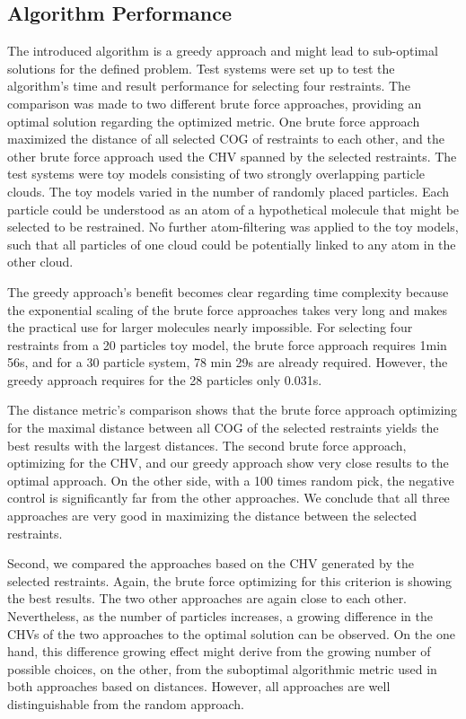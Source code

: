 
\subsection{Algorithm Performance}
The introduced algorithm is a greedy approach and might lead to sub-optimal solutions for the defined problem. Test systems were set up to test the algorithm's time and result performance for selecting four restraints. The comparison was made to two different brute force approaches, providing an optimal solution regarding the optimized metric. One brute force approach maximized the distance of all selected COG of restraints to each other, and the other brute force approach used the CHV spanned by the selected restraints. The test systems were toy models consisting of two strongly overlapping particle clouds. The toy models varied in the number of randomly placed particles.  Each particle could be understood as an atom of a hypothetical molecule that might be selected to be restrained. No further atom-filtering was applied to the toy models, such that all particles of one cloud could be potentially linked to any atom in the other cloud.

The greedy approach's benefit becomes clear regarding time complexity because the exponential scaling of the brute force approaches takes very long and makes the practical use for larger molecules nearly impossible. For selecting four restraints from a 20 particles toy model, the brute force approach requires 1min 56s, and for a 30 particle system, 78 min 29s are already required. However, the greedy approach requires for the 28 particles only 0.031s.

The distance metric's comparison shows that the brute force approach optimizing for the maximal distance between all COG of the selected restraints yields the best results with the largest distances. The second brute force approach, optimizing for the CHV, and our greedy approach show very close results to the optimal approach. On the other side, with a 100 times random pick, the negative control is significantly far from the other approaches. We conclude that all three approaches are very good in maximizing the distance between the selected restraints.

Second, we compared the approaches based on the CHV generated by the selected restraints. Again, the brute force optimizing for this criterion is showing the best results. The two other approaches are again close to each other. Nevertheless, as the number of particles increases, a growing difference in the CHVs of the two approaches to the optimal solution can be observed. On the one hand, this difference growing effect might derive from the growing number of possible choices, on the other, from the suboptimal algorithmic metric used in both approaches based on distances. However, all approaches are well distinguishable from the random approach.

